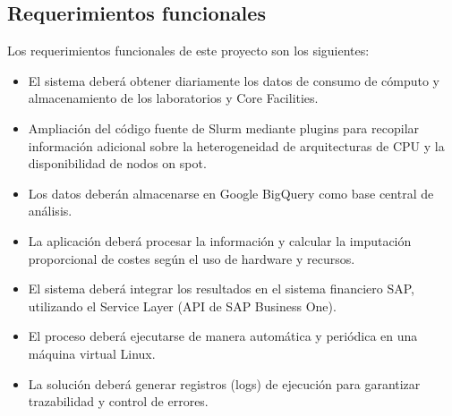\subsection{Requerimientos funcionales}
Los requerimientos funcionales de este proyecto son los siguientes:

\begin{itemize}
    \item El sistema deberá obtener diariamente los datos de consumo de cómputo y almacenamiento de los laboratorios y Core Facilities.
    \item Ampliación del código fuente de Slurm mediante plugins para recopilar información adicional sobre la heterogeneidad de arquitecturas de CPU y la disponibilidad de nodos on spot.
    \item Los datos deberán almacenarse en Google BigQuery como base central de análisis.
    \item La aplicación deberá procesar la información y calcular la imputación proporcional de costes según el uso de hardware y recursos.
    \item El sistema deberá integrar los resultados en el sistema financiero SAP, utilizando el Service Layer (API de SAP Business One).
    \item El proceso deberá ejecutarse de manera automática y periódica en una máquina virtual Linux.
    \item La solución deberá generar registros (logs) de ejecución para garantizar trazabilidad y control de errores.
\end{itemize}
